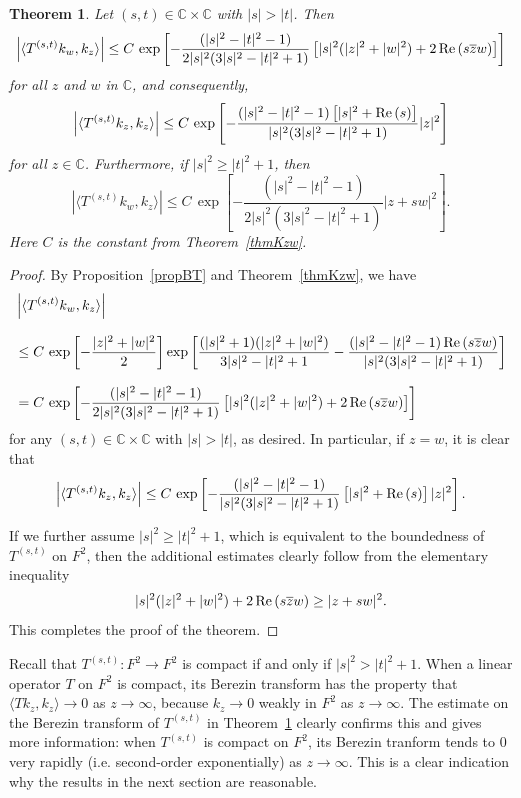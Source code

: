 \documentclass[reqno]{amsart}
\newtheorem{theorem}{Theorem}%
\newcommand{\C}{{\mathbb C}}
\DeclareMathOperator{\re}{{\rm Re}\,}
\begin{document}
\begin{theorem}\label{thmTKzw}
Let $(s, t)\in\C\times\C$ with $|s|>|t|$. Then
$$\left|\langle T^{(s,t)}k_w, k_z\rangle\right|\leq C\,
\exp\left[-\frac{(|s|^2-|t|^2-1)}{2|s|^2(3|s|^2-|t|^2+1)}
\left[|s|^2(|z|^2+|w|^2)+2\re ({s\overline{z}w})\right]\right]$$
for all $z$ and $w$ in $\C$, and consequently,
$$\left|\langle T^{(s,t)}k_z, k_z\rangle\right|\leq C\,
\exp\left[-\frac{(|s|^2-|t|^2-1)\left[|s|^2+\re ({s})\right]}
{|s|^2(3|s|^2-|t|^2+1)}|z|^2\right]$$
for all $z\in\C$. Furthermore, if $|s|^2\ge |t|^2+1$, then
$$ \left|\langle T^{(s,t)}k_w, k_z\rangle\right|\leq C\,
\exp\left[-\frac{(|s|^2-|t|^2-1)}{2|s|^2(3|s|^2-|t|^2+1)}|z+s w|^2
\right].$$
Here $C$ is the constant from Theorem~\ref{thmKzw}.
\end{theorem}

\begin{proof}
By Proposition~\ref{propBT} and Theorem~\ref{thmKzw}, we have
\begin{align*}
&\left|\langle T^{(s,t)}k_w, k_z\rangle\right|\\[8pt]
&\leq C\,\exp\left[-\frac{|z|^2+|w|^2}{2}\right]
\exp\left[\frac{(|s|^2+1)(|z|^2+|w|^2)}{3|s|^2-|t|^2+1}
-\frac{(|s|^2-|t|^2-1)\re ({s\overline{z}w})}{|s|^2(3|s|^2-|t|^2+1)}
\right]\\[8pt]
&=C\,\exp\left[-\frac{(|s|^2-|t|^2-1)}{2|s|^2(3|s|^2-|t|^2+1)}
\left[|s|^2(|z|^2+|w|^2)+2\re ({s\overline{z}w})\right]\right]
\end{align*}
for any $(s, t)\in\C\times\C$ with $|s|>|t|$, as desired. In particular,
if $z=w$, it is clear that
$$\left|\langle T^{(s,t)}k_z, k_z\rangle\right|\leq C\,\exp
\left[-\frac{(|s|^2-|t|^2-1)}{|s|^2(3|s|^2-|t|^2+1)}
\left[|s|^2+\re ({s})\right]|z|^2\right].$$

If we further assume $|s|^2\ge|t|^2+1$, which is equivalent to the
boundedness of $T^{(s,t)}$ on $F^{2}$, then the additional estimates
clearly follow from the elementary inequality
$$|s|^2(|z|^2+|w|^2)+2\re ({s\overline{z}w})\geq |z+s w|^2 .$$
This completes the proof of the theorem.
\end{proof}

Recall that $T^{(s,t)}: F^2\to F^2$ is compact if and only if
$|s|^2>|t|^2+1$. When a linear operator $T$ on $F^2$ is compact, its
Berezin transform has the property that $\langle Tk_z, k_z\rangle\to0$
as $z\to\infty$, because $k_z\to0$ weakly in
$F^2$ as $z\to\infty$. The estimate on the Berezin transform of $T^{(s,t)}$
in Theorem~\ref{thmTKzw} clearly confirms this and gives more information:
when $T^{(s,t)}$ is compact on $F^2$, its Berezin tranform tends to $0$
very rapidly (i.e. second-order exponentially) as $z\to\infty$. This is a clear
indication why the results in the next section are reasonable.
\end{document}
